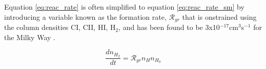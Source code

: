 Equation \ref{eq:reac_rate} is often simplified to equation \ref{eq:reac_rate_sm} by introducing a variable known as the formation rate, $\mathcal{R}_{gr}$ that is onstrained using the column densities CI, CII, HI, H$_2$, and has been found to be 3x10$^{-17}$cm$^3$s$^{-1}$ for the Milky Way \citep{jura1975, gry2002, wolfire2008}.

\begin{equation}\label{eq:reac_rate_sm}
  \frac{dn_{H_2}}{dt} = \mathcal{R}_{gr}n_H n_{H_0}
\end{equation}






